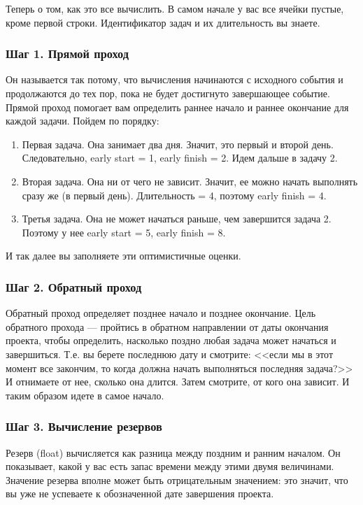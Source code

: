\documentclass{../../text-style}
\begin{document}
Теперь о том, как это все вычислить. В самом начале у вас все ячейки пустые, кроме первой строки. Идентификатор задач и их длительность вы знаете.

\subsubsection{Шаг 1. Прямой проход}

Он называется так потому, что вычисления начинаются с исходного события и продолжаются до тех пор, пока не будет достигнуто завершающее событие. Прямой проход помогает вам определить раннее начало и раннее окончание для каждой задачи. Пойдем по порядку:

\begin{enumerate}
    \item Первая задача. Она занимает два дня. Значит, это первый и второй день. Следовательно, early start = 1, early finish = 2. Идем дальше в задачу 2.
    \item Вторая задача. Она ни от чего не зависит. Значит, ее можно начать выполнять сразу же (в первый день). Длительность = 4, поэтому early finish = 4.
    \item Третья задача. Она не может начаться раньше, чем завершится задача 2. Поэтому у нее early start = 5, early finish = 8.
\end{enumerate}

И так далее вы заполняете эти оптимистичные оценки.

\subsubsection{Шаг 2. Обратный проход}

Обратный проход  определяет позднее начало и позднее окончание. Цель обратного прохода --- пройтись в обратном направлении от даты окончания проекта, чтобы определить, насколько поздно любая задача может начаться и завершиться. Т.е. вы берете последнюю дату и смотрите: <<если мы в этот момент все закончим, то когда должна начать выполняться последняя задача?>> И отнимаете от нее, сколько она длится. Затем смотрите, от кого она зависит. И таким образом идете в самое начало. 

\subsubsection{Шаг 3. Вычисление резервов}

Резерв (float) вычисляется как разница между поздним и ранним началом. Он показывает, какой у вас есть запас времени между этими двумя величинами. Значение резерва вполне может быть отрицательным значением: это значит, что вы уже не успеваете к обозначенной дате завершения проекта.
\end{document}
